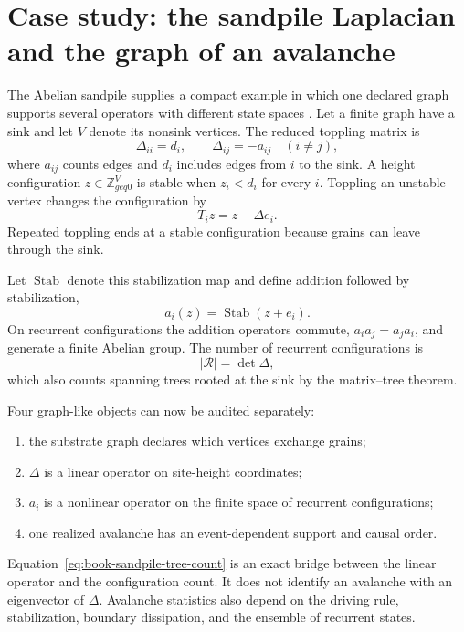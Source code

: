 \section[Case study: sandpile dynamics]{Case study: the sandpile Laplacian and the graph of an avalanche}

The Abelian sandpile supplies a compact example in which one declared graph supports several
operators with different state spaces \cite{dhar1990}.  Let a finite graph have a sink and let
$V$ denote its nonsink vertices.  The reduced toppling matrix is
\begin{equation}
\Delta_{ii}=d_i,
\qquad
\Delta_{ij}=-a_{ij}\quad(i\ne j),
\label{eq:book-toppling-matrix}
\end{equation}
where $a_{ij}$ counts edges and $d_i$ includes edges from $i$ to the sink.  A height configuration
$z\in\mathbb Z_{geq0}^{V}$ is stable when $z_i<d_i$ for every $i$.  Toppling an unstable vertex
changes the configuration by
\begin{equation}
T_i z=z-\Delta e_i.
\label{eq:book-single-toppling}
\end{equation}
Repeated toppling ends at a stable configuration because grains can leave through the sink.

Let $\operatorname{Stab}$ denote this stabilization map and define addition followed by
stabilization,
\begin{equation}
a_i(z)=\operatorname{Stab}(z+e_i).
\label{eq:book-sandpile-addition}
\end{equation}
On recurrent configurations the addition operators commute,
$a_ia_j=a_ja_i$, and generate a finite Abelian group.  The number of recurrent configurations is
\begin{equation}
|\mathcal R|=\det\Delta,
\label{eq:book-sandpile-tree-count}
\end{equation}
which also counts spanning trees rooted at the sink by the matrix--tree theorem.

Four graph-like objects can now be audited separately:
\begin{enumerate}
\setlength{\itemsep}{2pt}
\item the substrate graph declares which vertices exchange grains;
\item $\Delta$ is a linear operator on site-height coordinates;
\item $a_i$ is a nonlinear operator on the finite space of recurrent configurations;
\item one realized avalanche has an event-dependent support and causal order.
\end{enumerate}
Equation~\ref{eq:book-sandpile-tree-count} is an exact bridge between the linear operator and the
configuration count.  It does not identify an avalanche with an eigenvector of $\Delta$.  Avalanche
statistics also depend on the driving rule, stabilization, boundary dissipation, and the ensemble
of recurrent states.

